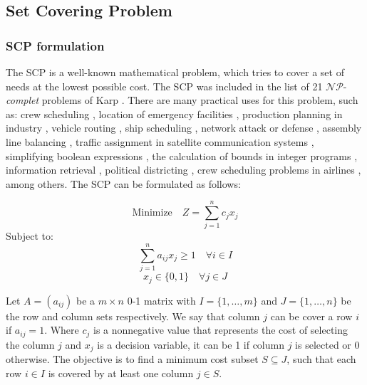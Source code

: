 \subsection{Set Covering Problem}
\subsubsection{SCP formulation}
The SCP is a well-known mathematical problem, which tries to cover a set of needs at the lowest possible cost. The SCP was included in the list of 21  $\mathcal{N} \mathcal{P}$-\textit{complet} problems of Karp \cite{DBLP:books/daglib/p/Karp10}. There are many practical uses for this problem, such as: crew scheduling \cite{ref02, ref08}, location of emergency facilities \cite{ref51,Vasko198485}, production planning in industry \cite{Vasko:1987:OSI:40299.40301,ref48, ref50}, vehicle routing \cite{ref07, ref27}, ship scheduling \cite{ref26, ref13}, network attack or defense \cite{ref14}, assembly line balancing \cite{ref28, ref41}, traffic assignment in satellite communication systems \cite{ref37, ceriaetal1998}, simplifying boolean expressions \cite{ref16}, the calculation of bounds in integer programs \cite{ref18}, information retrieval \cite{ref20}, political districting \cite{ref29}, crew scheduling problems in airlines \cite{doi:10.1287/inte.27.5.68}, among others.
The SCP can be formulated as follows:

\begin{equation} \label{ec:set-covering-1}  
\mbox{Minimize} \quad Z = \sum_{j = 1}^{n} c_j x_j
\end{equation}
Subject to:
\begin{equation} \label{ec:set-covering-2} 
\sum_{j = 1}^{n} a_{ij} x_j \geq 1 \quad  \forall i \in I
\end{equation}
\begin{equation} \label{ec:set-covering-3} 
x_j \in \{0,1\} \quad  \forall j \in J 
\end{equation}	


Let $A = (a_{ij})$ be a $m \times n$ 0-1 matrix with $I = \{ 1,\dots, m\}$ and $J = \{ 1,\dots, n\}$ be the row and column sets respectively. We say that column $j$ can be cover a row $i$ if $a_{ij} = 1$. Where $c_j$ is a nonnegative value that represents the cost of selecting the column $j$ and $x_j$ is a decision variable, it can be 1 if column $j$ is selected or 0 otherwise. The objective is to find a minimum cost subset $S \subseteq J$, such that each row $i \in I$ is covered by at least one column $j \in S$. 
\vspace{0mm}\\

